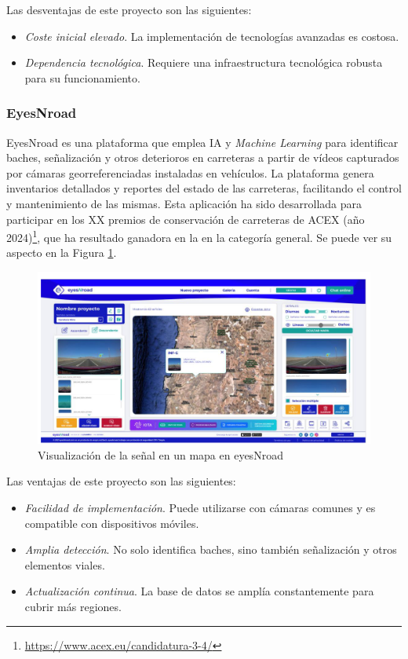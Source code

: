 Las desventajas de este proyecto son las siguientes:
\begin{itemize}
	\item \textit{Coste inicial elevado}. La implementación de tecnologías avanzadas es costosa.
	\item \textit{Dependencia tecnológica}. Requiere una infraestructura tecnológica robusta para su funcionamiento.
\end{itemize}


\subsubsection{EyesNroad}
\label{subsubsec:sistema3}

EyesNroad es una plataforma que emplea \ac{IA} y \textit{Machine Learning} para identificar baches, señalización y otros deterioros en carreteras a partir de vídeos capturados por cámaras georreferenciadas instaladas en vehículos. La plataforma genera inventarios detallados y reportes del estado de las carreteras, facilitando el control y mantenimiento de las mismas. Esta aplicación ha sido desarrollada para participar en los XX premios de conservación de carreteras de \ac{ACEX} (año 2024)\footnote{\url{https://www.acex.eu/candidatura-3-4/}}, que ha resultado ganadora en la en la categoría general. Se puede ver su aspecto en la Figura \ref{fig:enr}.

\begin{figure} [h!]
	\begin{center}
		\includegraphics[width=15cm]{figs/enr.png}
	\end{center}
	\caption{Visualización de la señal en un mapa en eyesNroad}
	\label{fig:enr}
\end{figure}


Las ventajas de este proyecto son las siguientes:

\begin{itemize}
	\item \textit{Facilidad de implementación}. Puede utilizarse con cámaras comunes y es compatible con dispositivos móviles.
	\item \textit{Amplia detección}. No solo identifica baches, sino también señalización y otros elementos viales.
	\item \textit{Actualización continua}. La base de datos se amplía constantemente para cubrir más regiones.
\end{itemize}

